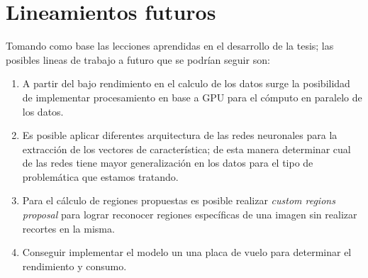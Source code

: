 \section{Lineamientos futuros} 
Tomando como base las lecciones aprendidas en el desarrollo de la tesis; las posibles lineas de trabajo a futuro que se podrían seguir son:
\begin{enumerate}
 \item A partir del bajo rendimiento en el calculo de los datos surge la posibilidad de implementar procesamiento en base a GPU para el cómputo 
en paralelo de los datos.
 \item Es posible aplicar diferentes arquitectura de las redes neuronales para la extracción de los vectores de característica; de esta manera 
determinar cual de las redes tiene mayor generalización en los datos para el tipo de problemática que estamos tratando.
 \item Para el cálculo de regiones propuestas es posible realizar \textit{custom regions proposal} para lograr reconocer regiones específicas de una 
imagen sin realizar recortes en la misma.
 \item Conseguir implementar el modelo un una placa de vuelo para determinar el rendimiento y consumo.
\end{enumerate}
